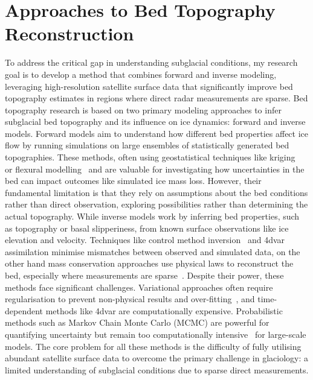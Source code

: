 \section{Approaches to Bed Topography Reconstruction}
To address the critical gap in understanding subglacial conditions, my research goal is to develop a method that combines forward and inverse modeling, leveraging high-resolution satellite surface data that significantly improve bed topography estimates in regions where direct radar measurements are sparse.
Bed topography research is based on two primary modeling approaches to infer subglacial bed topography and its influence on ice dynamics: forward and inverse models. Forward models aim to understand how different bed properties affect ice flow by running simulations on large ensembles of statistically generated bed topographies. These methods, often using geostatistical techniques like kriging~\cite{Mackie_2020} or flexural modelling~\cite{Jamieson_2023} and are valuable for investigating how uncertainties in the bed can impact outcomes like simulated ice mass loss. However, their fundamental limitation is that they rely on assumptions about the bed conditions rather than direct observation, exploring possibilities rather than determining the actual topography. While inverse models work by inferring bed properties, such as topography or basal slipperiness, from known surface observations like ice elevation and velocity. Techniques like control method inversion~\cite{deRydt_2013} and 4dvar assimilation minimise mismatches between observed and simulated data, on the other hand mass conservation approaches use physical laws to reconstruct the bed, especially where measurements are sparse~\cite{Morlighem_2017, Morlighem_2020}. Despite their power, these methods face significant challenges. Variational approaches often require regularisation to prevent non-physical results and over-fitting~\cite{Morlighem_Goldberg_2024}, and time-dependent methods like 4dvar are computationally expensive. Probabilistic methods such as Markov Chain Monte Carlo (MCMC) are powerful for quantifying uncertainty but remain too computationally intensive~\cite{Morlighem_Goldberg_2024} for large-scale models. The core problem for all these methods is the difficulty of fully utilising abundant satellite surface data to overcome the primary challenge in glaciology: a limited understanding of subglacial conditions due to sparse direct measurements.

